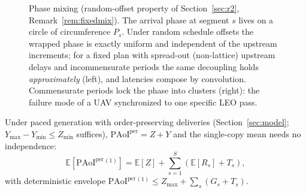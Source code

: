 \documentclass[twocolumn,3p,times,procedia]{elsarticle}
\theoremstyle{plain}
\theoremstyle{remark}
\newcommand{\PAoIper}{\mathrm{PAoI}^{\mathrm{per}}}
\newcommand{\E}{\mathbb{E}}
\begin{document}
\begin{figure}[t]
\centering
{}
\caption{Phase mixing (random-offset property of
Section~\ref{sec:r2}, Remark~\ref{rem:fixedmix}). The arrival phase at
segment $s$ lives on a circle of circumference $P_s$. Under random
schedule offsets the wrapped phase is exactly uniform and independent
of the upstream increments; for a fixed plan with spread-out
(non-lattice) upstream delays and incommensurate periods the same
decoupling holds \emph{approximately} (left), and latencies compose by
convolution. Commensurate periods lock the phase into clusters (right):
the failure mode of a UAV synchronized to one specific LEO pass.}
\label{fig:mixing}
\end{figure}

Under paced generation with order-preserving deliveries
(Section~\ref{sec:model}; $Y_{\max}-Y_{\min}\le Z_{\min}$ suffices),
$\PAoIper=Z+Y$ and the single-copy mean needs no independence:
\begin{equation}
\E[\PAoIper{}^{(1)}]=\E[Z]+\sum_{s=1}^S(\E[R_s]+T_s),
\end{equation}
with deterministic envelope $\PAoIper{}^{(1)}\le Z_{\max}+\sum_s(G_s+T_s)$.
\end{document}
